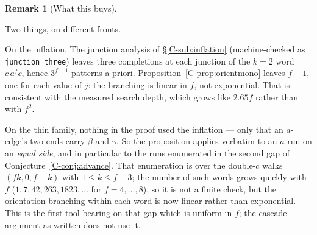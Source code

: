 \documentclass[11pt,reqno]{amsart}
\theoremstyle{plain}
\theoremstyle{definition}
\newtheorem{remark}[theorem]{Remark}
\begin{document}
\begin{remark}[What this buys]\label{O-orientmono}

Two things, on different fronts.

On the inflation, The junction analysis of \S\ref{C-sub:inflation} (machine-checked as \texttt{junction\_three}) leaves three completions at each junction of the $k=2$ word
$c\,a^{f}c$, hence $3^{f-1}$ patterns a priori. Proposition~\ref{C-prop:orientmono} leaves $f+1$, one for
each value of $j$: the branching is linear in $f$, not exponential. That is consistent with the
measured search depth, which grows like $2.65f$ rather than with $f^2$.

On the thin family, nothing in the proof used the inflation --- only that an $a$-edge's two ends carry
$\beta$ and $\gamma$. So the proposition applies verbatim to an $a$-run on an \emph{equal side}, and in
particular to the runs enumerated in the second gap of Conjecture~\ref{C-conj:advance}. That enumeration
is over the double-$c$ walks $(fk,0,f-k)$ with $1\le k\le f-3$; the number of such words grows quickly
with $f$ \textup{(}$1,7,42,263,1823,\dots$ for $f=4,\dots,8$\textup{)}, so it is not a finite check, but
the orientation branching within each word is now linear rather than exponential. This is the first
tool bearing on that gap which is uniform in $f$; the cascade argument as written does not use it.
\end{remark}
\end{document}
